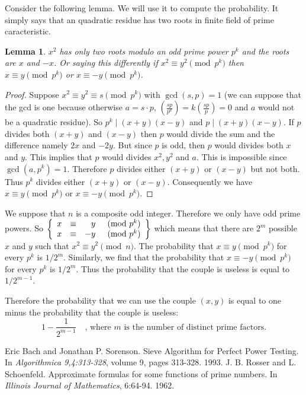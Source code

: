 \documentclass[12pt,a4paper]{article}
\newtheorem{lemma}{Lemma}
\begin{document}
        Consider the following lemma. We will use it to compute the probability. It simply says that an quadratic residue has two roots in finite field of prime caracteristic.
        \begin{lemma}
            $x^2$ has only two roots modulo an odd prime power $p^k$ and the roots are $x$ and $-x$.
            Or saying this differently if $x^2 \equiv y^2 \pmod{p^k}$ then $x \equiv y \pmod{p^k}$ or $x \equiv -y \pmod{p^k}$.
        \end{lemma}
        \begin{proof}
        Suppose $x^2 \equiv y^2 \equiv s \pmod{p^k}$ with $\gcd(s,p) = 1$ (we can suppose that the gcd is one because otherwise 
        $a = s\cdot p$, $\left(\frac{sp}{p^k}\right) = k\left(\frac{sp}{p}\right) = 0$ and $a$ would not be a quadratic residue). 
        So $p^k \mid (x+y)(x-y)$ and $p \mid (x+y)(x-y)$.
        If $p$ divides both $(x+y)$ and $(x-y)$ then $p$ would divide the sum and the difference namely $2x$ and $-2y$.
        But since $p$ is odd, then $p$ would divides both $x$ and $y$. This implies that $p$ would divides $x^2,y^2$ and $a$. This is impossible
        since $\gcd(a,p^k)= 1$. Therefore $p$ divides either $(x+y)$ or $(x-y)$ but not both. Thus $p^k$ divides either $(x+y)$ or $(x-y)$.
        Consequently we have $x\equiv y \pmod{p^k}$ or $x\equiv -y \pmod{p^k}$.
        \end{proof}
        We suppose that $n$ is a composite odd integer. Therefore we only have odd prime powers. So $\left\{
            \begin{array}{l l r l} x &\equiv&  y & \pmod{p^k}\\
                                   x &\equiv& -y & \pmod{p^k}\\
        \end{array}\right\}$ which means that there are $2^m$ possible $x$ and $y$ such that $x^2 \equiv y^2 \pmod n$.
        The probability that $x \equiv y \pmod{p^k}$ for every $p^k$ is $1/2^m$. Similarly, we find that the probability that $x \equiv -y \pmod{p^k}$ for every $p^k$ is $1/2^m$.
        Thus the probability that the couple is useless is equal to $1/2^{m-1}$.

        Therefore the probability that we can use the couple $(x,y)$ is equal to one minus the probability that the couple is useless:
        \[ 
            1 - \frac{1}{2^{m-1}} \quad\text{, where $m$ is the number of distinct prime factors.}
        \]

    \begin{thebibliography}{1}
        Eric Bach and Jonathan P. Sorenson. Sieve Algorithm for Perfect Power Testing.
        In \emph{Algorithmica 9,4:313-328}, volume 9, pages 313-328. 1993. 
        J. B. Rosser and L. Schoenfeld. Approximate formulas for some functions of prime numbers. 
        In \emph{Illinois Journal of Mathematics}, 6:64-94. 1962.
    \end{thebibliography}
\end{document}
